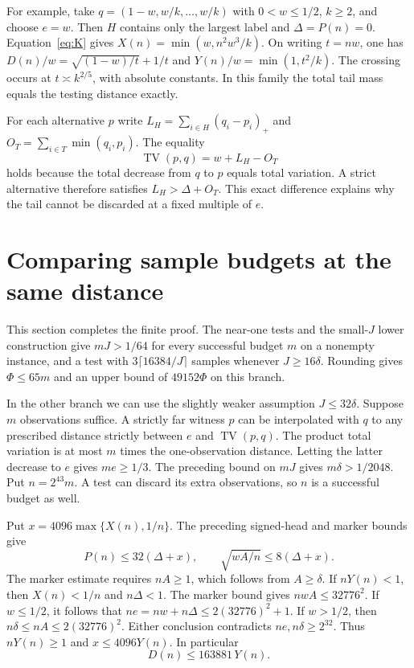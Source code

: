 \documentclass[11pt]{article}
\newcommand{\TV}{\operatorname{TV}}
\begin{document}
For example, take $q=(1-w,w/k,\ldots,w/k)$ with $0<w\le1/2$, $k\ge2$, and choose $e=w$. Then $H$ contains only the largest label and $\Delta=P(n)=0$. Equation~\eqref{eq:K} gives $X(n)=\min(w,n^2w^3/k)$. On writing $t=nw$, one has $D(n)/w=\sqrt{(1-w)/t}+1/t$ and $Y(n)/w=\min(1,t^2/k)$. The crossing occurs at $t\asymp k^{2/5}$, with absolute constants. In this family the total tail mass equals the testing distance exactly.

For each alternative $p$ write $L_H=\sum_{i\in H}(q_i-p_i)_+$ and $O_T=\sum_{i\in T}\min(q_i,p_i)$. The equality
\begin{equation}\label{eq:split-tv}
             \TV(p,q)=w+L_H-O_T
\end{equation}
holds because the total decrease from $q$ to $p$ equals total variation. A strict alternative therefore satisfies $L_H>\Delta+O_T$. This exact difference explains why the tail cannot be discarded at a fixed multiple of $e$.





\section{Comparing sample budgets at the same distance}\label{sec:horizontal}
This section completes the finite proof. The near-one tests and the small-$J$ lower construction give $mJ>1/64$ for every successful budget $m$ on a nonempty instance, and a test with $3\lceil16384/J\rceil$ samples whenever $J\ge16\delta$. Rounding gives $\Phi\le65m$ and an upper bound of $49152\Phi$ on this branch.

In the other branch we can use the slightly weaker assumption $J\le32\delta$. Suppose $m$ observations suffice. A strictly far witness $p$ can be interpolated with $q$ to any prescribed distance strictly between $e$ and $\TV(p,q)$. The product total variation is at most $m$ times the one-observation distance. Letting the latter decrease to $e$ gives $me\ge1/3$. The preceding bound on $mJ$ gives $m\delta>1/2048$. Put $n=2^{43}m$. A test can discard its extra observations, so $n$ is a successful budget as well.

Put $x=4096\max\{X(n),1/n\}$. The preceding signed-head and marker bounds give
\[
       P(n)\le32(\Delta+x),\qquad
       \sqrt{wA/n}\le8(\Delta+x).
\]
The marker estimate requires $nA\ge1$, which follows from $A\ge\delta$. If $nY(n)<1$, then $X(n)<1/n$ and $n\Delta<1$. The marker bound gives $nwA\le32776^2$. If $w\le1/2$, it follows that $ne=nw+n\Delta\le2(32776)^2+1$. If $w>1/2$, then $n\delta\le nA\le2(32776)^2$. Either conclusion contradicts $ne,n\delta\ge2^{32}$. Thus $nY(n)\ge1$ and $x\le4096Y(n)$. In particular
\begin{equation}\label{eq:weak}
             D(n)\le163881\,Y(n).
\end{equation}
\end{document}
